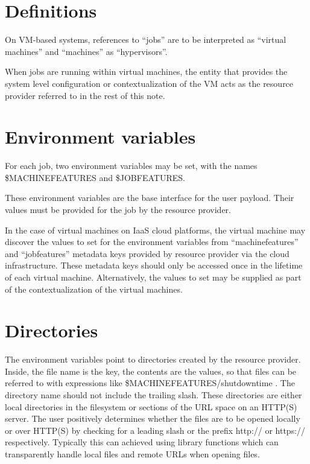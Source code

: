 \documentclass[12pt,a4paper]{article}
\begin{document}
\section{Definitions}
\label{sec:Definitions}

On VM-based systems, references to ``jobs'' are to be interpreted
as ``virtual machines'' and ``machines'' as ``hypervisors''.

When jobs are running within virtual machines, the entity that provides 
the system level configuration or contextualization of the VM acts
as the resource provider referred to in the rest of this note.

\section{Environment variables}
\label{sec:EnvironmentVariables}

For each job, two environment variables may be set, with the names
\$MACHINEFEATURES and \$JOBFEATURES.

These environment variables are the base interface for the user payload.
Their values must be provided for the job by the resource provider. 

In the
case of virtual machines on IaaS cloud platforms, the virtual machine
may discover the values to set for the environment variables from 
``machinefeatures'' and ``jobfeatures'' metadata keys provided by resource
provider via the cloud
infrastructure. These metadata keys should only be accessed once in the
lifetime of each virtual machine. Alternatively, the values to set may
be supplied as part of the contextualization of the virtual machines.

\section{Directories}
\label{sec:Directories}

The environment variables point to directories created by the resource
provider. Inside, the file name is the key, the contents are the values, so
that files can be referred to with expressions like
\$MACHINEFEATURES/shutdowntime . The directory name should not include the
trailing slash. These directories are either local directories in the
filesystem or sections of the URL space on an HTTP(S) server. The user
positively determines whether the files are to be opened locally or over
HTTP(S) by checking for a leading slash or the prefix http:// or https://
respectively. Typically this can achieved using library functions which can
transparently handle local files and remote URLs when opening files. 
\end{document}
